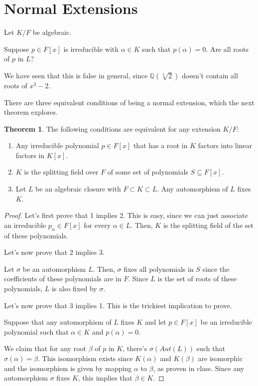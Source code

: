 \documentclass{article}
\theoremstyle{definition}
\newtheorem{theorem}{Theorem}[section]
\newcommand{\Q}{\mathbb{Q}}
\begin{document}
\newpage

\section{Normal Extensions}

Let $K/F$ be algebraic.

Suppose $p \in F[x]$ is irreducible with $\alpha \in K$
such that $p(\alpha) = 0$. Are all roots of $p$ in $L$?

We have seen that this is false in general, since $\Q(\sqrt[3]{2})$
doesn't contain all roots of $x^{3} - 2$.

There are three equivalent conditions of being a normal extension, which the next theorem
explores.

\begin{theorem}
    The following conditions are equivalent for any extension $K/F$:
    \begin{enumerate}
        \item Any irreducible polynomial $p \in F[x]$ that has a root in $K$ factors into linear factors in $K[x]$.
        \item $K$ is the splitting field over $F$ of some set of polynomials $S \subseteq F[x]$.
        \item Let $L$ be an algebraic closure with $F \subset K \subset L$. Any automorphism of $L$ fixes $K$.
    \end{enumerate}
\end{theorem}
\begin{proof}
    Let's first prove that 1 implies 2. This is easy, since we can just associate an irreducible $p_{\alpha} \in F[x]$
    for every $\alpha \in L$. Then, $K$ is the splitting field of the set of these polynomials.

    Let's now prove that 2 implies 3.

    Let $\sigma$ be an automorphism $L$. Then, $\sigma$ fixes all polynomials in $S$ since the coefficients
    of these polynomials are in $F$. Since $L$ is the set of roots of these polynomials, $L$ is also fixed by
    $\sigma$.

    Let's now prove that 3 implies 1. This is the trickiest implication to prove.

    Suppose that any automorphism of $L$ fixes $K$ and let $p \in F[x]$ be an irreducible
    polynomial such that $\alpha \in K$ and $p(\alpha) = 0$.

    We claim that for any root $\beta$ of $p$ in $K$, there's $\sigma(Aut(L))$ such that
    $\sigma(\alpha) = \beta$. This isomorphism exists since $K(\alpha)$ and $K(\beta)$
    are isomorphic and the isomorphism is given by mapping $\alpha$ to $\beta$, as proven in class.
    Since any automorphism $\sigma$ fixes $K$, this implies that $\beta \in K$.
\end{proof}
\end{document}
